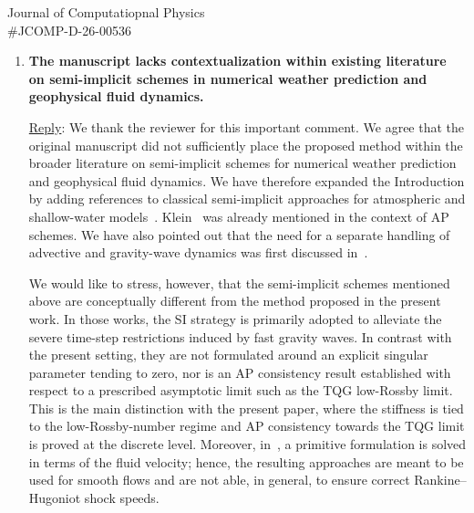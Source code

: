 \documentclass[letter,11pt]{letter}
\begin{document}
\begin{letter}{Journal of Computatiopnal Physics\\\#JCOMP-D-26-00536}
\begin{enumerate}
We have revised the manuscript to make this operational rationale clearer. In particular, we now emphasize that the coupling is not intended as an arbitrary combination of two independent schemes, but rather as a way to exploit the AP consistency of the primitive formulation in the low-Rossby limit while retaining the robustness and correct shock-capturing properties of the conservative formulation away from that limit.

More specifically, we have remarked it in the abstract and in the introduction.




\medskip
\item
{\bf The manuscript lacks contextualization within existing literature on semi-implicit schemes in numerical weather prediction and geophysical fluid dynamics.}

\medskip
{\sc\underline{Reply}}: We thank the reviewer for this important comment. We agree that the original manuscript did not sufficiently place the proposed method within the broader literature on semi-implicit schemes for numerical weather prediction and geophysical fluid dynamics. We have therefore expanded the Introduction by adding references to classical semi-implicit approaches for atmospheric and shallow-water models~\cite{machenhauer1977dynamics,temperton1987efficient,ritchie1988application,staniforth1991semi,smolarkiewicz2016finite,thuburn2014mimetic,weller2014non}. Klein~\cite{Klein_1995} was already mentioned in the context of AP schemes.
We have also pointed out that the need for a separate handling of advective and gravity-wave dynamics was first discussed in~\cite{machenhauer1977dynamics}.

We would like to stress, however, that the semi-implicit schemes mentioned above are conceptually different from the method proposed in the present work. In those works, the SI strategy is primarily adopted to alleviate the severe time-step restrictions induced by fast gravity waves. In contrast with the present setting, they are not formulated around an explicit singular parameter tending to zero, nor is an AP consistency result established with respect to a prescribed asymptotic limit such as the TQG low-Rossby limit. This is the main distinction with the present paper, where the stiffness is tied to the low-Rossby-number regime and AP consistency towards the TQG limit is proved at the discrete level.
Moreover, in~\cite{temperton1987efficient,ritchie1988application,staniforth1991semi,thuburn2014mimetic,weller2014non}, a primitive formulation is solved in terms of the fluid velocity; hence, the resulting approaches are meant to be used for smooth flows and are not able, in general, to ensure correct Rankine--Hugoniot shock speeds.


\end{enumerate}
\end{letter}
\end{document}
